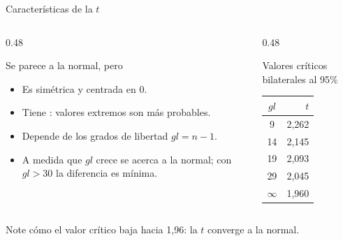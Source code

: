 \documentclass[aspectratio=169,10pt]{beamer}
\begin{document}
\begin{frame}{Características de la $t$}
  \begin{columns}[T,onlytextwidth]
    \begin{column}{0.48\textwidth}
      \begin{block}{Se parece a la normal, pero}
        \footnotesize
        \begin{itemize}
          \item Es simétrica y centrada en 0.
          \item Tiene : valores extremos son más
                probables.
          \item Depende de los grados de libertad $gl=n-1$.
          \item A medida que $gl$ crece se acerca a la normal; con $gl>30$ la
                diferencia es mínima.
        \end{itemize}
      \end{block}
    \end{column}
    \begin{column}{0.48\textwidth}
      \begin{exampleblock}{Valores críticos bilaterales al 95\%}
        \footnotesize
        \begin{center}
        \begin{tabular}{@{}cr@{}}
          \toprule
          $gl$ & $t$ \\
          \midrule
          9   & 2{,}262 \\
          14  & 2{,}145 \\
          19  & 2{,}093 \\
          29  & 2{,}045 \\
          $\infty$ & 1{,}960 \\
          \bottomrule
        \end{tabular}
        \end{center}
      \end{exampleblock}
    \end{column}
  \end{columns}

  \vspace{0.15cm}
  {\scriptsize\color{uniGris} Note cómo el valor crítico baja hacia 1{,}96: la
  $t$ converge a la normal.}
\end{frame}
\end{document}
